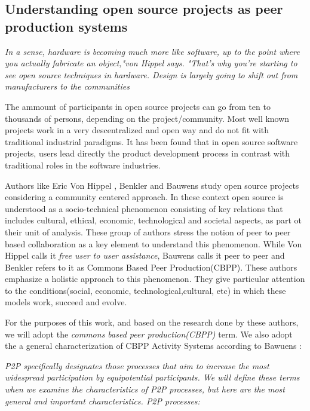 \documentclass{ICED-Paper}%
\begin{document}
\subsection{Understanding open source projects as peer production systems}
\emph{In a sense, hardware is becoming much more like software, up to the point where you actually fabricate an object,"von Hippel says. "That's why you're starting to see open source techniques in hardware. Design is largely going to shift out from manufacturers to the communities}\cite{OH_works?}
\bigskip

The ammount of participants in open source projects can go from ten to thousands of persons, depending on the project/community. Most well known projects work in a very descentralized and open way and do not fit with traditional industrial paradigms. It has been found that in open source software projects, users lead directly the product development process in contrast with traditional roles in the software industries\cite{HowItWorks}.
\bigskip

Authors like Eric Von Hippel \cite{hippel_2}, Benkler \cite{Benkler} and Bauwens \cite{p2pEconomy} study open source projects considering a community centered approach. In these context open source is understood as a socio-technical phenomenon consisting of key relations that includes cultural, ethical, economic, technological and societal aspects, as part ot their unit of analysis. These group of authors stress the notion of peer to peer based collaboration as a key element to understand this phenomenon. While Von Hippel calls it \emph{free user to user assistance}, Bauwens calls it peer to peer and Benkler refers to it as Commons Based Peer Production(CBPP). These authors emphasize a holistic approach to this phenomenon. They give particular attention to the conditions(social, economic, technological,cultural, etc) in which these models work, succeed and evolve.
\bigskip

For the purposes of this work, and based on the research done by these authors, we will adopt the \emph{commons based peer production(CBPP)} term. We also adopt the a general characterization of CBPP Activity Systems according to Bawuens \cite{p2pEconomy}:

\emph{P2P specifically designates those processes that aim to increase the most widespread participation by equipotential participants. We will define these terms when we examine the characteristics of P2P processes, but here are the most general and important characteristics.
P2P processes:}
\end{document}
